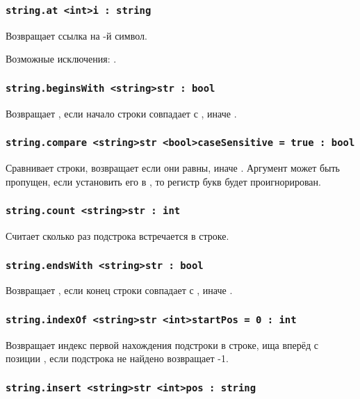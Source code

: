 \subsubsection{\lstinline|string.at <int>i : string|}

Возвращает ссылка на -й символ.

Возможные исключения: .

\subsubsection{\lstinline|string.beginsWith <string>str : bool|}

Возвращает \true{}, если начало строки совпадает с , иначе \false{}.

\subsubsection{\lstinline|string.compare <string>str <bool>caseSensitive = true : bool|}

Сравнивает строки, возвращает \true{} если они равны, иначе \false{}. Аргумент  может быть пропущен, если установить его в \false{}, то регистр букв будет проигнорирован.

\subsubsection{\lstinline|string.count <string>str : int|}

Считает сколько раз подстрока  встречается в строке.

\subsubsection{\lstinline|string.endsWith <string>str : bool|}

Возвращает \true{}, если конец строки совпадает с , иначе \false{}.

\subsubsection{\lstinline|string.indexOf <string>str <int>startPos = 0 : int|}

Возвращает индекс первой нахождения подстроки  в строке, ища вперёд с позиции , если подстрока не найдено возвращает -1.

\subsubsection{\lstinline|string.insert <string>str <int>pos : string|}

